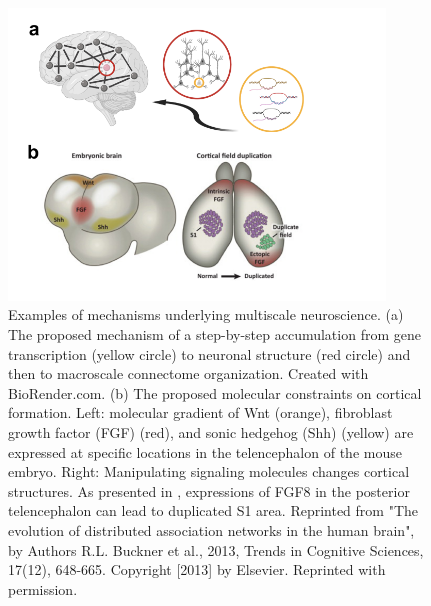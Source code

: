 \begin{refsection}
\begin{figure}[h]
    \centering
    \includegraphics[width=10cm]{images/discussionFigure.png}
    \caption{Examples of mechanisms underlying multiscale neuroscience. (a) The proposed mechanism of a step-by-step accumulation from gene transcription (yellow circle) to neuronal structure (red circle) and then to macroscale connectome organization. Created with BioRender.com. (b) The proposed molecular constraints on cortical formation. Left: molecular gradient of Wnt (orange), fibroblast growth factor (FGF) (red), and sonic hedgehog (Shh) (yellow) are expressed at specific locations in the telencephalon of the mouse embryo. Right: Manipulating signaling molecules changes cortical structures. As presented in \citep{FukuchiShimogori2001NeocortexPB}, expressions of FGF8 in the posterior telencephalon can lead to duplicated S1 area. Reprinted from "The evolution of distributed association networks in the human brain", by Authors R.L. Buckner et al., 2013, Trends in Cognitive Sciences, 17(12), 648-665. Copyright [2013] by Elsevier. Reprinted with permission.}
    \label{disFig4}
\end{figure}


\end{refsection}
